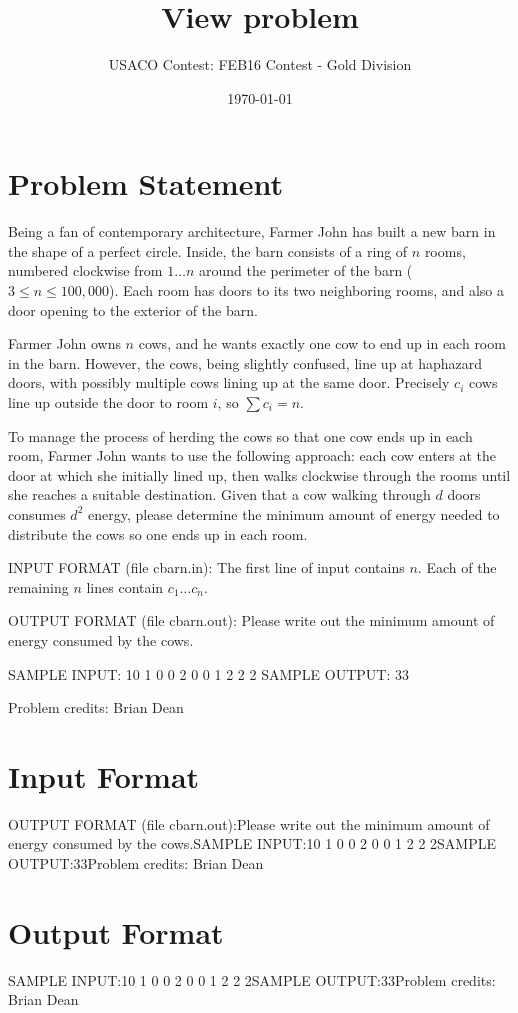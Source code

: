 \documentclass[12pt]{article}
\title{View problem}
\author{USACO Contest: FEB16 Contest - Gold Division}
\date{\today}
\begin{document}
\maketitle

\section*{Problem Statement}

Being a fan of contemporary architecture, Farmer John has built a new barn in the
shape of a perfect circle.  Inside, the barn consists of a ring of $n$ rooms, 
numbered clockwise from $1 \ldots n$ around the perimeter of the barn
($3 \leq n \leq 100,000$).   Each room has doors to its two neighboring rooms,
and also a door opening to the exterior of the barn.

Farmer John owns $n$ cows, and he wants exactly one cow to end up in each room
in the barn.  However, the cows, being slightly confused, line up at haphazard
doors, with possibly multiple cows lining up at the same door.  Precisely $c_i$
cows line up outside the door to room $i$, so $\sum c_i = n$.

To manage the process of herding the cows so that one cow ends up in each room,
Farmer John wants to use the following approach: each cow enters at the door at
which she initially lined up, then walks clockwise through the rooms until she
reaches a suitable destination.  Given that a cow walking through $d$ doors
consumes $d^2$ energy, please determine the minimum amount of energy needed to
distribute the cows so one ends up in each room.  

INPUT FORMAT (file cbarn.in):
The first line of input contains $n$.  Each of the remaining $n$ lines contain
$c_1 \ldots c_n$.

OUTPUT FORMAT (file cbarn.out):
Please write out the minimum amount of energy consumed by the cows.  

SAMPLE INPUT:
10
1
0
0
2
0
0
1
2
2
2
SAMPLE OUTPUT: 
33

Problem credits: Brian Dean



\section*{Input Format}
OUTPUT FORMAT (file cbarn.out):Please write out the minimum amount of energy consumed by the cows.SAMPLE INPUT:10
1
0
0
2
0
0
1
2
2
2SAMPLE OUTPUT:33Problem credits: Brian Dean

\section*{Output Format}
SAMPLE INPUT:10
1
0
0
2
0
0
1
2
2
2SAMPLE OUTPUT:33Problem credits: Brian Dean
\end{document}
